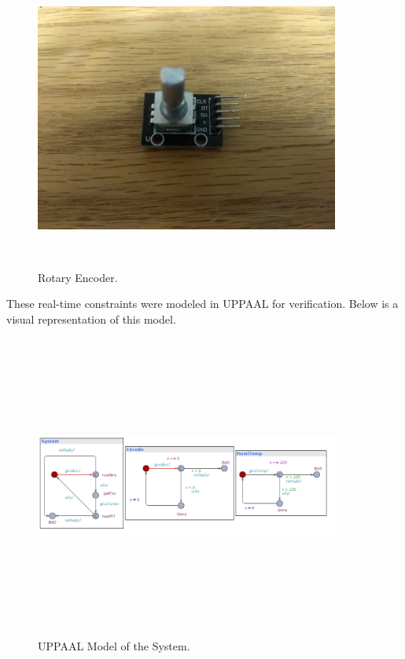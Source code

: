 \documentclass[letterpaper, 12pt]{article}
\begin{document}
\begin{figure}[H]
	\centering
	\includegraphics[width=10cm,height=10cm,keepaspectratio]{encoder.jpg}
	\caption[Sensor2]{Rotary Encoder.}
	\label{fig:encoder}
\end{figure}
These real-time constraints were modeled in UPPAAL for verification.  Below is a visual representation of this model.
~\newline 
\begin{figure}[H]
	\centering
	\includegraphics[width=10cm,height=10cm,keepaspectratio]{system.png}
	\caption[Model]{UPPAAL Model of the System.}
	\label{fig:model}
\end{figure}
\end{document}
